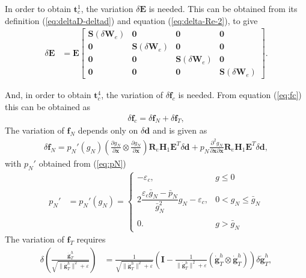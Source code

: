 \documentclass[3p]{elsarticle}
\newcommand{\vect}[1]{\boldsymbol{#1}}
\begin{document}
In order to obtain $\vect{t}_c^1$, the variation $\delta\vect{E}$ is needed. This can be obtained from its definition (\ref{eq:deltaD-deltad}) and equation (\ref{eq:delta-Re-2}), to give
\begin{align}
	\delta\vect{E}&=\vect{E}\left[\begin{array}{cccc}
		\vect{S}(\delta\vect{W}_e) &\vect{0} &\vect{0} &\vect{0}\\
		\vect{0} &\vect{S}(\delta\vect{W}_e) &\vect{0} &\vect{0}\\
		\vect{0} & \vect{0} &\vect{S}(\delta\vect{W}_e) &\vect{0}\\
		\vect{0} & \vect{0} &\vect{0} &\vect{S}(\delta\vect{W}_e)
	\end{array}\right].\label{eq:deltaE}
\end{align}

\noindent And, in order to obtain $\vect{t}_{c}^4$, the variation of $\delta\vect{f}_c$ is needed. From equation (\ref{eq:fc}) this can be obtained as
\begin{align}
	\delta\vect{f}_c =\delta\vect{f}_N + \delta\vect{f}_T\label{eq:deltafc},
\end{align}
\noindent  The variation of $\vect{f}_N$ depends only on $\delta\vect{d}$ and is given as
\begin{align}
	\delta \vect{f}_N  =  p_N'(g_N)  \left(\frac{\partial g_N}{\partial\vect{x}}\otimes\frac{\partial g_N}{\partial\vect{x}}\right)\vect{R}_e\vect{H}_1\vect{E}^T\delta\vect{d}+p_N\frac{\partial^2g_N}{\partial\vect{x}\partial\vect{x}}\vect{R}_e\vect{H}_1\vect{E}^T\delta\vect{d},\label{eq:deltapN}
\end{align}
\noindent with $p_N'$ obtained from (\ref{eq:pN})
\begin{align}
	p_N' &= p_N'(g_N)=\left\{\begin{array}{ll}
		-\varepsilon_c ,&g\leq 0\\
		&\\
		2\dfrac{\varepsilon_c\bar{g}_N-\bar{p}_N}{\bar{g}_N^2}g_N-\varepsilon_c ,&0<g_N\leq \bar{g}_N\\
		&\\
		0.&g>\bar{g}_N
	\end{array}\right.\label{eq:pNprime}
\end{align}
The variation of $\vect{f}_T$ requires 
\begin{align}
	\delta\left(\frac{\dot{\vect{g}}_T^h}{\sqrt{\|\dot{\vect{g}}_T^h\|^2+\varepsilon}}\right)&=\frac{1}{\sqrt{\|\dot{\vect{g}}_T^h\|^2+\varepsilon}}\left(\vect{I}-\frac{1}{\|\dot{\vect{g}}_T^h\|^2+\varepsilon}(\dot{\vect{g}}_T^h\otimes\dot{\vect{g}}_T^h)\right)\delta\dot{\vect{g}}_T^h,\label{eq:delta_normalized_vector}
\end{align}
\end{document}
